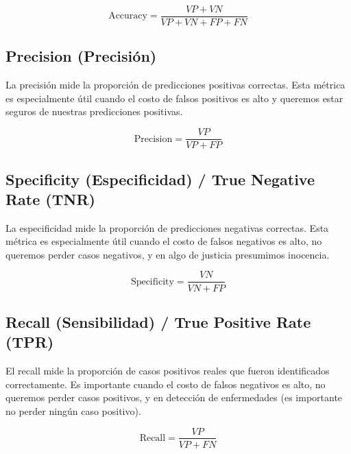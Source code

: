 \documentclass[12pt]{article}
\begin{document}
\vspace{0.3em}

\[
\text{Accuracy} = \frac{VP + VN}{VP + VN + FP + FN}
\]

\vspace{0.3em}

\subsection{Precision (Precisión)}
La precisión mide la proporción de predicciones positivas correctas. Esta métrica es especialmente útil cuando el costo de falsos positivos es alto y queremos estar seguros de nuestras predicciones positivas.

\vspace{0.3em}

\[
\text{Precision} = \frac{VP}{VP + FP}
\]

\vspace{0.3em}

\subsection{Specificity (Especificidad) / True Negative Rate (TNR)}
La especificidad mide la proporción de predicciones negativas correctas. Esta métrica es especialmente útil cuando el costo de falsos negativos es alto, no queremos perder casos negativos, y en algo de justicia presumimos inocencia.

\vspace{0.3em}

\[
\text{Specificity} = \frac{VN}{VN + FP}
\]

\vspace{0.3em}

\subsection{Recall (Sensibilidad) / True Positive Rate (TPR)}
El recall mide la proporción de casos positivos reales que fueron identificados correctamente. Es importante cuando el costo de falsos negativos es alto, no queremos perder casos positivos, y en detección de enfermedades (es importante no perder ningún caso positivo).

\vspace{0.3em}

\[
\text{Recall} = \frac{VP}{VP + FN}
\]

\vspace{0.3em}
\end{document}
